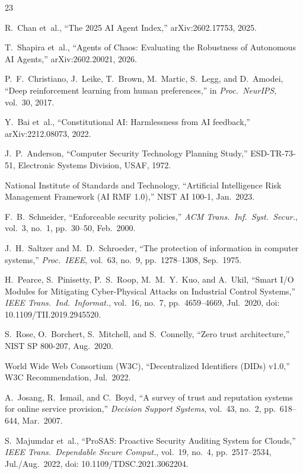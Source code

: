 \documentclass{IEEEcsmag}
\begin{document}
\begin{thebibliography}{23}

R.~Chan et~al., ``The 2025 AI Agent Index,'' arXiv:2602.17753, 2025.

T.~Shapira et~al., ``Agents of Chaos: Evaluating the Robustness of Autonomous AI Agents,'' arXiv:2602.20021, 2026.

P.~F.~Christiano, J.~Leike, T.~Brown, M.~Martic, S.~Legg, and D.~Amodei, ``Deep reinforcement learning from human preferences,'' in {\it Proc.\ NeurIPS}, vol.~30, 2017.

Y.~Bai et~al., ``Constitutional AI: Harmlessness from AI feedback,'' arXiv:2212.08073, 2022.

J.~P.~Anderson, ``Computer Security Technology Planning Study,'' ESD-TR-73-51, Electronic Systems Division, USAF, 1972.

National Institute of Standards and Technology, ``Artificial Intelligence Risk Management Framework (AI RMF 1.0),'' NIST AI 100-1, Jan.\ 2023.

F.~B.~Schneider, ``Enforceable security policies,'' {\it ACM Trans.\ Inf.\ Syst.\ Secur.}, vol.~3, no.~1, pp.~30--50, Feb.\ 2000.

J.~H.~Saltzer and M.~D.~Schroeder, ``The protection of information in computer systems,'' {\it Proc.\ IEEE}, vol.~63, no.~9, pp.~1278--1308, Sep.\ 1975.

H.~Pearce, S.~Pinisetty, P.~S.~Roop, M.~M.~Y.~Kuo, and A.~Ukil, ``Smart I/O Modules for Mitigating Cyber-Physical Attacks on Industrial Control Systems,'' {\it IEEE Trans.\ Ind.\ Informat.}, vol.~16, no.~7, pp.~4659--4669, Jul.\ 2020, doi: 10.1109/TII.2019.2945520.

S.~Rose, O.~Borchert, S.~Mitchell, and S.~Connelly, ``Zero trust architecture,'' NIST SP 800-207, Aug.\ 2020.

World Wide Web Consortium (W3C), ``Decentralized Identifiers (DIDs) v1.0,'' W3C Recommendation, Jul.\ 2022.

A.~Josang, R.~Ismail, and C.~Boyd, ``A survey of trust and reputation systems for online service provision,'' {\it Decision Support Systems}, vol.~43, no.~2, pp.~618--644, Mar.\ 2007.

S.~Majumdar et~al., ``ProSAS: Proactive Security Auditing System for Clouds,'' {\it IEEE Trans.\ Dependable Secure Comput.}, vol.~19, no.~4, pp.~2517--2534, Jul./Aug.\ 2022, doi: 10.1109/TDSC.2021.3062204.


\end{thebibliography}
\end{document}

